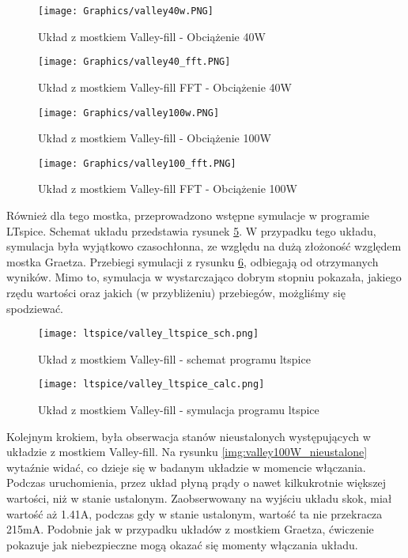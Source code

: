 \begin{figure}[H]
    \centering
    \texttt{[image: Graphics/valley40w.PNG]}
    \caption{Układ z mostkiem Valley-fill - Obciążenie 40W}
    \label{img:valley40W}
\end{figure}

\begin{figure}[H]
    \centering
    \texttt{[image: Graphics/valley40\_fft.PNG]}
    \caption{Układ z mostkiem Valley-fill FFT - Obciążenie 40W}
    \label{img:valley40W_fft}
\end{figure}

\begin{figure}[H]
    \centering
    \texttt{[image: Graphics/valley100w.PNG]}
    \caption{Układ z mostkiem Valley-fill - Obciążenie 100W}
    \label{img:valley100W}
\end{figure}

\begin{figure}[H]
    \centering
    \texttt{[image: Graphics/valley100\_fft.PNG]}
    \caption{Układ z mostkiem Valley-fill FFT - Obciążenie 100W}
    \label{img:valley100W_fft}
\end{figure}

Również dla tego mostka, przeprowadzono wstępne symulacje w programie LTspice. Schemat układu przedstawia rysunek \ref{img:valley_ltspice_sch}. W przypadku tego układu, symulacja była wyjątkowo czasochłonna, ze względu na dużą złożoność względem mostka Graetza. Przebiegi symulacji z rysunku \ref{img:valley_ltspice_calc}, odbiegają od otrzymanych wyników. Mimo to, symulacja w wystarczająco dobrym stopniu pokazała, jakiego rzędu wartości oraz jakich (w przybliżeniu) przebiegów, możgliśmy się spodziewać.

\begin{figure}[H]
    \centering
    \texttt{[image: ltspice/valley\_ltspice\_sch.png]}
    \caption{Układ z mostkiem Valley-fill - schemat programu ltspice}
    \label{img:valley_ltspice_sch}
\end{figure}

\begin{figure}[H]
    \centering
    \texttt{[image: ltspice/valley\_ltspice\_calc.png]}
    \caption{Układ z mostkiem Valley-fill - symulacja programu ltspice}
    \label{img:valley_ltspice_calc}
\end{figure}

Kolejnym krokiem, była obserwacja stanów nieustalonych występujących w układzie z mostkiem Valley-fill. Na rysunku \ref{img:valley100W_nieustalone} wytaźnie widać, co dzieje się w badanym układzie w momencie włączania. Podczas uruchomienia, przez układ płyną prądy o nawet kilkukrotnie większej wartości, niż w stanie ustalonym. Zaobserwowany na wyjściu układu skok, miał wartość aż 1.41A, podczas gdy w stanie ustalonym, wartość ta nie przekracza 215mA. Podobnie jak w przypadku układów z mostkiem Graetza, ćwiczenie pokazuje jak niebezpieczne mogą okazać się momenty włączania układu.

